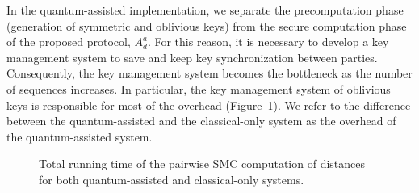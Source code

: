 In the quantum-assisted implementation, we separate the precomputation phase (generation of symmetric and oblivious keys) from the secure computation phase of the proposed protocol, $A^a_d$. For this reason, it is necessary to develop a key management system to save and keep key synchronization between parties. Consequently, the key management system becomes the bottleneck as the number of sequences increases. In particular, the key management system of oblivious keys is responsible for most of the overhead (Figure~\ref{fig:okms}). We refer to the difference between the quantum-assisted and the classical-only system as the overhead of the quantum-assisted system.


\begin{figure}
    \centering
{}
    \caption{Total running time of the pairwise SMC computation of distances for both quantum-assisted and classical-only systems.}
    \label{fig:okms}
\end{figure}


